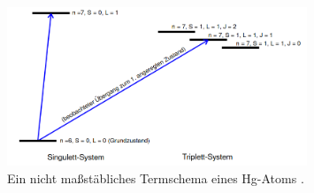     \begin{figure}[H]
        \centering 
        \includegraphics[width=0.8\textwidth]{bilder/Termschema.png}
        \caption{Ein nicht maßstäbliches Termschema eines Hg-Atoms \cite{anleitung}.}
        \label{fig:termschema}
    \end{figure}


